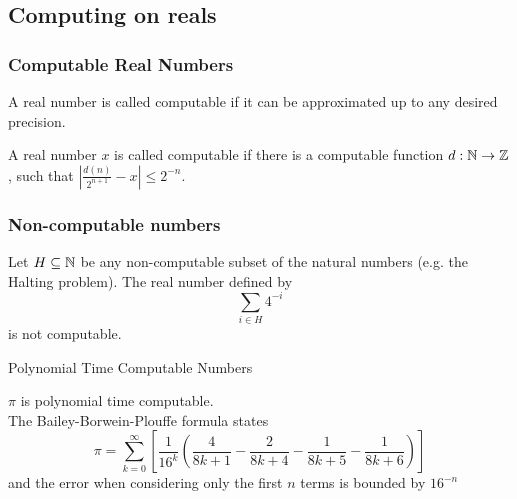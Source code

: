 \subsection{Computing on reals}
\begin{frame}
\frametitle{Computable Real Numbers}
  A real number is called computable if it can be approximated up to any desired precision.
  \vfill
  \pause
\begin{minipage}{.45\textwidth}
		\begin{figure}
		\centering
    \vfill
		\end{figure}
	\end{minipage}
	\hfill
	\begin{minipage}{.45\textwidth}
	\begin{definition}
		A real number $x$ is called computable if there is a computable function $d:\mathbb{N}\to\mathbb{Z}$, such that $ \left|\frac{d(n)}{2^{n+1}} - x\right|\leq 2^{-n}$.   
	\end{definition}
	\end{minipage}
\end{frame}
\begin{frame}
  \frametitle{Non-computable numbers}
  \begin{example}[Specker]
    Let $H \subseteq \mathbb{N}$ be any non-computable subset of the natural numbers (e.g. the Halting problem).
    \pause
    The real number defined by 
    $$
      \sum_{i \in H} 4^{-i}
    $$
    is not computable.
  \end{example}
\end{frame}
\begin{frame}[t]{Polynomial Time Computable Numbers}
  \begin{example}
  $\pi$ is polynomial time computable. \\
  The Bailey-Borwein-Plouffe formula states
  $$
  \pi = \sum_{k = 0}^{\infty}\left[ \frac{1}{16^k} \left( \frac{4}{8k + 1} - \frac{2}{8k + 4} - \frac{1}{8k + 5} - \frac{1}{8k + 6} \right) \right]
  $$
  and the error when considering only the first $n$ terms is bounded by $16^{-n}$
  \end{example}
\end{frame}
